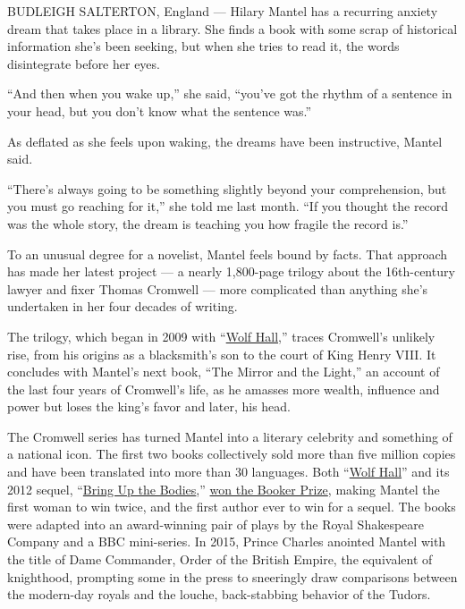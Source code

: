 BUDLEIGH SALTERTON, England --- Hilary Mantel has a recurring anxiety
dream that takes place in a library. She finds a book with some scrap of
historical information she's been seeking, but when she tries to read
it, the words disintegrate before her eyes.

``And then when you wake up,'' she said, ``you've got the rhythm of a
sentence in your head, but you don't know what the sentence was.''

As deflated as she feels upon waking, the dreams have been instructive,
Mantel said.

``There's always going to be something slightly beyond your
comprehension, but you must go reaching for it,'' she told me last
month. ``If you thought the record was the whole story, the dream is
teaching you how fragile the record is.''

To an unusual degree for a novelist, Mantel feels bound by facts. That
approach has made her latest project --- a nearly 1,800-page trilogy
about the 16th-century lawyer and fixer Thomas Cromwell --- more
complicated than anything she's undertaken in her four decades of
writing.

The trilogy, which began in 2009 with
``\href{https://www.nytimes3xbfgragh.onion/2009/10/05/books/05maslin.html}{Wolf
Hall},'' traces Cromwell's unlikely rise, from his origins as a
blacksmith's son to the court of King Henry VIII. It concludes with
Mantel's next book, ``The Mirror and the Light,'' an account of the last
four years of Cromwell's life, as he amasses more wealth, influence and
power but loses the king's favor and later, his head.

The Cromwell series has turned Mantel into a literary celebrity and
something of a national icon. The first two books collectively sold more
than five million copies and have been translated into more than 30
languages. Both
``\href{https://www.nytimes3xbfgragh.onion/2009/11/01/books/review/Benfey-t.html}{Wolf
Hall}'' and its 2012 sequel,
``\href{https://www.nytimes3xbfgragh.onion/2012/05/02/books/bring-up-the-bodies-a-wolf-hall-sequel-by-hilary-mantel.html}{Bring
Up the Bodies},''
\href{https://artsbeat.blogs.nytimes3xbfgragh.onion/2012/10/16/hilary-mantel-wins-a-second-booker-prize/}{won
the Booker Prize}, making Mantel the first woman to win twice, and the
first author ever to win for a sequel. The books were adapted into an
award-winning pair of plays by the Royal Shakespeare Company and a BBC
mini-series. In 2015, Prince Charles anointed Mantel with the title of
Dame Commander, Order of the British Empire, the equivalent of
knighthood, prompting some in the press to sneeringly draw comparisons
between the modern-day royals and the louche, back-stabbing behavior of
the Tudors.

